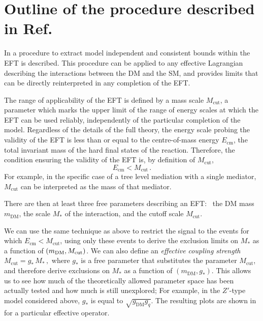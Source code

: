 \clearpage

\section*{Outline of the procedure described in Ref.~\cite{Racco:2015dxa}}

In \cite{Racco:2015dxa} a procedure to extract model independent and consistent bounds within the EFT is described. This procedure can be applied to any effective Lagrangian describing the interactions between the DM and the SM, and provides limits that can be directly reinterpreted in any completion of the EFT.

The range of applicability of the EFT is defined by a mass scale $M_\text{cut}$, a parameter which marks the upper limit of the range of energy scales at which the EFT can be used reliably, independently of the particular completion of the model. 
Regardless of the  details of the full theory, the energy scale probing the validity of the EFT is less than or equal to the centre-of-mass energy $E_\text{cm}$, 
the total invariant mass of the hard final states of the reaction.
Therefore, the condition ensuring the validity of the EFT is, by definition of $M_\text{cut}$,
\begin{equation}
\label{Ecm<Mcut}
E_\text{cm}<M_\text{cut}\,.
\end{equation}
For example, in the specific case of a tree level mediation with a single mediator, $M_\text{cut}$ can be interpreted as the mass of that mediator.

There are then at least three free parameters describing an EFT:~ 
the DM mass $m_\text{DM}$, the scale $M_*$ of the interaction, and the cutoff scale $M_\text{cut}$.

We can use the same technique as above to restrict the signal to the events for which $E_\text{cm}<M_\text{cut}$,  using only these events to derive the exclusion limits on $M_*$ as a function of  $(m_\text{DM},M_{\rm cut})$. 
%
We can also define an \textit{effective coupling strength} $M_\text{cut}=g_* \, M_*\,,$ where $g_*$ is a free parameter that substitutes the parameter $M_\text{cut}$, and therefore derive exclusions on $M_*$ as a function of $(m_\text{DM},g_*)$. This allows us to see how much of the theoretically allowed parameter space has been actually tested and how much is still unexplored; For example, in the $Z'$-type model considered above, $g_*$ is equal to $\sqrt{g_\text{DM}g_q}$.
%
The resulting plots are shown in \cite{Racco:2015dxa} for a particular effective operator. 

